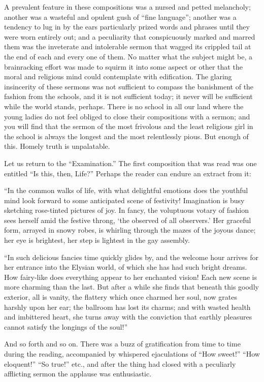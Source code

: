 \documentclass{book}
\begin{document}
A prevalent feature in these compositions was a nursed and petted melancholy; another was a wasteful and opulent gush of “fine language”; another was a tendency to lug in by the ears particularly prized words and phrases until they were worn entirely out; and a peculiarity that conspicuously marked and marred them was the inveterate and intolerable sermon that wagged its crippled tail at the end of each and every one of them. No matter what the subject might be, a brainracking effort was made to squirm it into some aspect or other that the moral and religious mind could contemplate with edification. The glaring insincerity of these sermons was not sufficient to compass the banishment of the fashion from the schools, and it is not sufficient today; it never will be sufficient while the world stands, perhaps. There is no school in all our land where the young ladies do not feel obliged to close their compositions with a sermon; and you will find that the sermon of the most frivolous and the least religious girl in the school is always the longest and the most relentlessly pious. But enough of this. Homely truth is unpalatable.

Let us return to the “Examination.” The first composition that was read was one entitled “Is this, then, Life?” Perhaps the reader can endure an extract from it:

“In the common walks of life, with what delightful emotions does the youthful mind look forward to some anticipated scene of festivity! Imagination is busy sketching rose-tinted pictures of joy. In fancy, the voluptuous votary of fashion sees herself amid the festive throng, ‘the observed of all observers.’ Her graceful form, arrayed in snowy robes, is whirling through the mazes of the joyous dance; her eye is brightest, her step is lightest in the gay assembly.

“In such delicious fancies time quickly glides by, and the welcome hour arrives for her entrance into the Elysian world, of which she has had such bright dreams. How fairy-like does everything appear to her enchanted vision! Each new scene is more charming than the last. But after a while she finds that beneath this goodly exterior, all is vanity, the flattery which once charmed her soul, now grates harshly upon her ear; the ballroom has lost its charms; and with wasted health and imbittered heart, she turns away with the conviction that earthly pleasures cannot satisfy the longings of the soul!”

And so forth and so on. There was a buzz of gratification from time to time during the reading, accompanied by whispered ejaculations of “How sweet!” “How eloquent!” “So true!” etc., and after the thing had closed with a peculiarly afflicting sermon the applause was enthusiastic.
\end{document}
